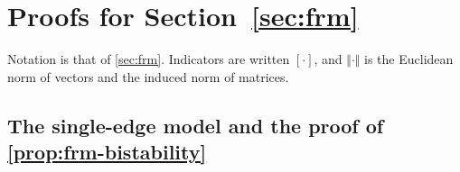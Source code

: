 \section{Proofs for \texorpdfstring{Section~\ref{sec:frm}}{formation}}\label{app:frm}

Notation is that of \cref{sec:frm}. Indicators are written $[\cdot]$, and $\Vert\cdot\Vert$ is the Euclidean norm of vectors and the induced norm of matrices.

\subsection*{The single-edge model and the proof of \texorpdfstring{\cref{prop:frm-bistability}}{the bistability proposition}}

